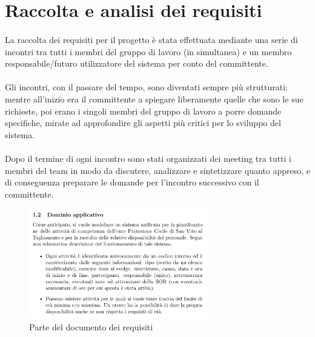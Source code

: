 \documentclass[12pt,a4paper,twoside,english,italian]{book}
\begin{document}
\section{Raccolta e analisi dei requisiti}

\paragraph{} La raccolta dei requisiti per il progetto è stata effettuata mediante una serie di incontri tra tutti i membri del gruppo di lavoro (in simultanea) e un membro responsabile/futuro utilizzatore del sistema per conto del committente. 

\paragraph{} Gli incontri, con il passare del tempo, sono diventati sempre più strutturati: mentre all'inizio era il committente a spiegare liberamente quelle che sono le sue richieste, poi erano i singoli membri del gruppo di lavoro a porre domande specifiche, mirate ad approfondire gli aspetti più critici per lo sviluppo del sistema. 

\paragraph{} Dopo il termine di ogni incontro sono stati organizzati dei meeting tra tutti i membri del team in modo da discutere, analizzare e sintetizzare quanto appreso, e di conseguenza preparare le domande per l'incontro successivo con il committente.

\newpage

\begin{figure}[H]
    \centering
    \includegraphics[width=0.7\textwidth]{img/requisiti_dominio.pdf}
    \caption{Parte del documento dei requisiti}
\end{figure}
\end{document}
